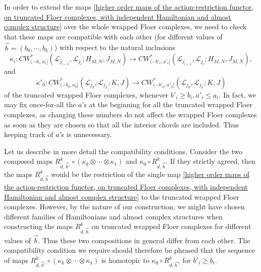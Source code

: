 \documentclass{amsart}
\numberwithin{equation}{section}
\numberwithin{figure}{section}
\begin{document}
	In order to extend the maps \eqref{higher order maps of the action-restriction functor, on truncated Floer complexes, with independent Hamiltonian and almost complex structure} over the whole wrapped Floer complexes, we need to check that these maps are compatible with each other (for different values of $\vec{b} = (b_{0}, \cdots, b_{k})$) with respect to the natural inclusions
\begin{equation*}
\kappa_{i}: CW^{*}_{(-b_{i}, a_{i}]}(\mathcal{L}_{j_{i-1}}, \mathcal{L}_{j_{i}}; H_{M, N}, J_{M, N}) \to CW^{*}_{(-b'_{i}, a'_{i}]}(\mathcal{L}_{j_{i-1}}, \mathcal{L}_{j_{i}}; H_{M, N}, J_{M, N}),
\end{equation*}
and
\begin{equation*}
\kappa'_{0}: CW^{*}_{(-b_{0}, a_{0}]}(\mathcal{L}_{j_{0}}, \mathcal{L}_{j_{k}}; K, J) \to CW^{*}_{(-b'_{0}, a'_{0}]}(\mathcal{L}_{j_{0}}, \mathcal{L}_{j_{k}}; K, J)
\end{equation*}
of the truncated wrapped Floer complexes, whenever $b'_{i} \ge b_{i}, a'_{i} \le a_{i}$. In fact, we may fix once-for-all the $a$'s at the beginning for all the truncated wrapped Floer complexes, as changing these numbers do not affect the wrapped Floer complexes as soon as they are chosen so that all the interior chords are included. Thus keeping track of $a$'s is unnecessary. \par
	Let us describe in more detail the compatibility conditions. Consider the two composed maps $R_{d, \vec{b}'}^{k} \circ (\kappa_{k} \otimes \cdots \otimes \kappa_{1})$ and $\kappa_{0} \circ R_{d, \vec{b}}^{k}$. If they strictly agreed, then the maps $R_{d, \vec{b}}^{k}$ would be the restriction of the single map \eqref{higher order maps of the action-restriction functor, on truncated Floer complexes, with independent Hamiltonian and almost complex structure} to the truncated wrapped Floer complexes. However, by the nature of our construction, we might have chosen different families of Hamiltonians and almost complex structures when constructing the maps $R_{d, \vec{b}}^{k}$ on truncated wrapped Floer complexes for different values of $\vec{b}$. Thus these two compositions in general differ from each other. The compatibility condition we require should therefore be phrased that the sequence of maps $R_{d, \vec{b}'}^{k} \circ (\kappa_{k} \otimes \cdots \otimes \kappa_{1})$ is homotopic to $\kappa_{0} \circ R_{d, \vec{b}}^{k}$, for $b'_{i} \ge b_{i}$. \par
\end{document}
